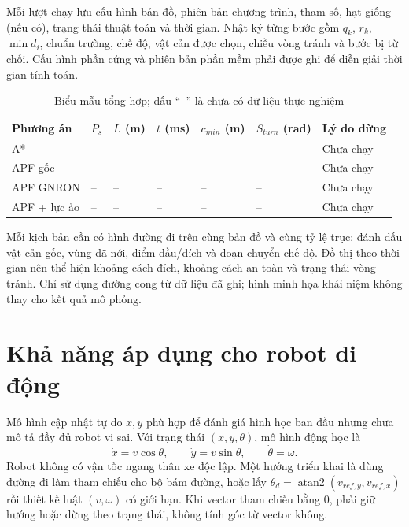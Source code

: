\documentclass[12pt,a4paper,oneside]{report}
\numberwithin{equation}{chapter}
\begin{document}
Mỗi lượt chạy lưu cấu hình bản đồ, phiên bản chương trình, tham số, hạt giống (nếu có), trạng thái thuật toán và thời gian. Nhật ký từng bước gồm $q_k$, $r_k$, $\min d_i$, chuẩn trường, chế độ, vật cản được chọn, chiều vòng tránh và bước bị từ chối. Cấu hình phần cứng và phiên bản phần mềm phải được ghi để diễn giải thời gian tính toán.

\begin{table}[htbp]
\centering\small
\caption{Biểu mẫu tổng hợp; dấu ``--'' là chưa có dữ liệu thực nghiệm}
\begin{tabular}{|>{\raggedright\arraybackslash}p{2cm}|>{\raggedright\arraybackslash}p{1.3cm}|>{\raggedright\arraybackslash}p{1.4cm}|>{\raggedright\arraybackslash}p{1.7cm}|>{\raggedright\arraybackslash}p{1.5cm}|>{\raggedright\arraybackslash}p{1.5cm}|>{\raggedright\arraybackslash}p{2.2cm}|}\hline
Phương án & $P_s$ & $L$ (m) & $t$ (ms) & $c_{min}$ (m) & $S_{turn}$ (rad) & Lý do dừng\\\hline
A* & -- & -- & -- & -- & -- & Chưa chạy\\\hline
APF gốc & -- & -- & -- & -- & -- & Chưa chạy\\\hline
APF GNRON & -- & -- & -- & -- & -- & Chưa chạy\\\hline
APF + lực ảo & -- & -- & -- & -- & -- & Chưa chạy\\\hline
\end{tabular}
\end{table}

Mỗi kịch bản cần có hình đường đi trên cùng bản đồ và cùng tỷ lệ trục; đánh dấu vật cản gốc, vùng đã nới, điểm đầu/đích và đoạn chuyển chế độ. Đồ thị theo thời gian nên thể hiện khoảng cách đích, khoảng cách an toàn và trạng thái vòng tránh. Chỉ sử dụng đường cong từ dữ liệu đã ghi; hình minh họa khái niệm không thay cho kết quả mô phỏng.

\section{Khả năng áp dụng cho robot di động}

Mô hình cập nhật tự do $x,y$ phù hợp để đánh giá hình học ban đầu nhưng chưa mô tả đầy đủ robot vi sai. Với trạng thái $(x,y,\theta)$, mô hình động học là
\begin{equation}
\dot x=v\cos\theta,\qquad \dot y=v\sin\theta,\qquad \dot\theta=\omega.
\end{equation}
Robot không có vận tốc ngang thân xe độc lập. Một hướng triển khai là dùng đường đi làm tham chiếu cho bộ bám đường, hoặc lấy $\theta_d=\operatorname{atan2}(v_{ref,y},v_{ref,x})$ rồi thiết kế luật $(v,\omega)$ có giới hạn. Khi vector tham chiếu bằng 0, phải giữ hướng hoặc dừng theo trạng thái, không tính góc từ vector không.
\end{document}
